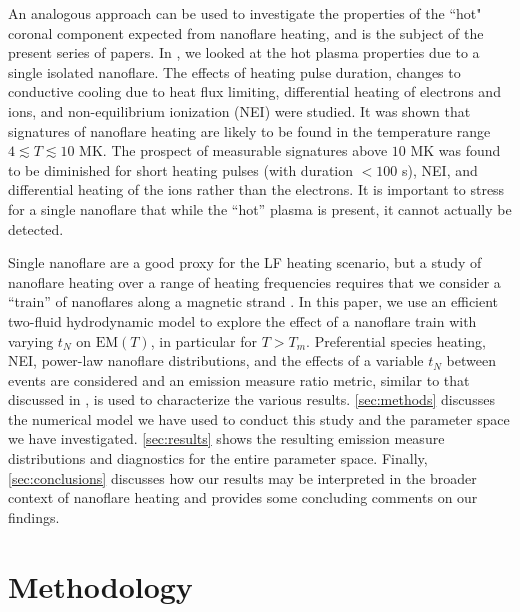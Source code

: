 \documentclass[preprint,linenumbers]{aastex}
\begin{document}
	\par An analogous approach can be used to investigate the properties of the ``hot" coronal component expected from nanoflare heating, and is the subject of the present series of papers. In \citet{barnes_inference_2016-1} , we looked at the hot plasma properties due to a single isolated nanoflare. The effects of heating pulse duration, changes to conductive cooling due to heat flux limiting, differential heating of electrons and ions, and non-equilibrium ionization (NEI) were studied. It was shown that signatures of nanoflare heating are likely to be found in the temperature range $4\lesssim T\lesssim 10$ MK. The prospect of measurable signatures above $10$ MK was found to be diminished for short heating pulses (with duration $<100$ s), NEI, and differential heating of the ions rather than the electrons. It is important to stress for a single nanoflare that while the ``hot'' plasma is present, it cannot actually be detected.
	\par Single nanoflare are a good proxy for the LF heating scenario, but a study of nanoflare heating over a range of heating frequencies requires that we consider a ``train'' of nanoflares along a magnetic strand \citep{viall_patterns_2011,warren_constraints_2011,reep_diagnosing_2013,cargill_modelling_2015}. In this paper, we use an efficient two-fluid hydrodynamic model to explore the effect of a nanoflare train with varying $t_N$ on $\mathrm{EM}(T)$, in particular for $T>T_m$. Preferential species heating, NEI, power-law nanoflare distributions, and the effects of a variable $t_N$ between events are considered and an emission measure ratio metric, similar to that discussed in \citet{brosius_pervasive_2014}, is used to characterize the various results. \autoref{sec:methods} discusses the numerical model we have used to conduct this study and the parameter space we have investigated. \autoref{sec:results} shows the resulting emission measure distributions and diagnostics for the entire parameter space. Finally, \autoref{sec:conclusions} discusses how our results may be interpreted in the broader context of nanoflare heating and provides some concluding comments on our findings.
	\section{Methodology}
	\label{sec:methods}
\end{document}
